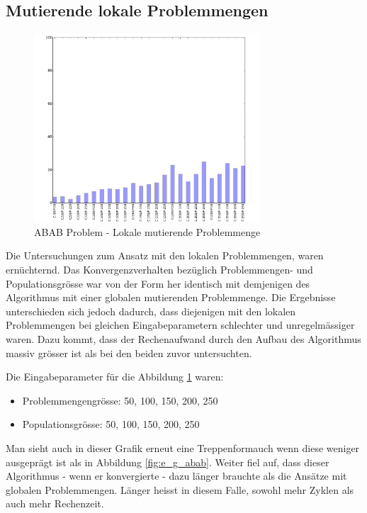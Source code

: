 \subsection{Mutierende lokale Problemmengen}
\begin{figure}[h]
  \centering
  \includegraphics[width=0.75\textwidth]{images/E_L_abab_solved.pdf}
  \caption[ABAB Problem - Lokale mutierende Problemmenge]{ABAB Problem - Lokale mutierende Problemmenge}
  \label{fig:e_l_abab}
\end{figure}

Die Untersuchungen zum Ansatz mit den lokalen Problemmengen, waren ernüchternd. Das Konvergenzverhalten bezüglich Problemmengen- und Populationsgrösse war von der Form her identisch mit demjenigen des Algorithmus mit einer globalen mutierenden Problemmenge. Die Ergebnisse unterschieden sich jedoch dadurch, dass diejenigen mit den lokalen Problemmengen bei gleichen Eingabeparametern schlechter und unregelmässiger waren. Dazu kommt, dass der Rechenaufwand durch den Aufbau des Algorithmus massiv grösser ist als bei den beiden zuvor untersuchten.

Die Eingabeparameter für die Abbildung \ref{fig:e_l_abab} waren:
\begin{itemize}
	\item Problemmengengrösse: 50, 100, 150, 200, 250
	\item Populationsgrösse: 50, 100, 150, 200, 250
\end{itemize}

Man sieht auch in dieser Grafik erneut eine \flqq Treppenform\frqq auch wenn diese weniger ausgeprägt ist als in Abbildung \ref{fig:e_g_abab}. Weiter fiel auf, dass dieser Algorithmus - wenn er konvergierte - dazu länger brauchte als die Ansätze mit globalen Problemmengen. Länger heisst in diesem Falle, sowohl mehr Zyklen als auch mehr Rechenzeit.